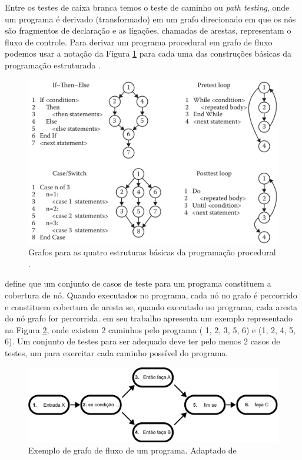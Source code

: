 Entre os testes de caixa branca temos o teste de caminho ou \textit{path testing}, onde um programa é derivado (transformado) em um grafo direcionado em que os nós são fragmentos de declaração e as ligações, chamadas de arestas, representam o fluxo de controle. Para derivar um programa procedural em grafo de fluxo podemos usar a notação da Figura \ref{fig:4estrutura_basica} para cada uma das construções básicas da programação estruturada \cite{jorgensen2016software}.

\begin{figure}[ht]
\centering
\includegraphics[scale=0.3]{imagens/const_basica_grafo.png}
\caption{Grafos para as quatro estruturas básicas da programação procedural \cite{jorgensen2016software}.}
\label{fig:4estrutura_basica}
\end{figure}

\cite{jorgensen2016software} define que um conjunto de casos de teste para um programa constituem a cobertura de nó. Quando executados no programa, cada nó no grafo é percorrido e constituem cobertura de aresta se, quando executado no programa, cada aresta do nó grafo for percorrida. \cite{winikoff2014testability} em seu trabalho apresenta um exemplo representado na Figura \ref{fig:exemplo_grafo}, onde existem 2 caminhos pelo programa ( 1, 2, 3, 5, 6) e (1, 2, 4, 5, 6). Um conjunto de testes para ser adequado deve ter pelo menos 2 casos de testes, um para exercitar cada caminho possível do programa.

\begin{figure}[ht]
\centering
\includegraphics[scale=0.7]{imagens/exemplo_grafo.pdf}
\caption{Exemplo de grafo de fluxo de um programa. Adaptado de \cite{winikoff2014testability}}
\label{fig:exemplo_grafo}
\end{figure}


